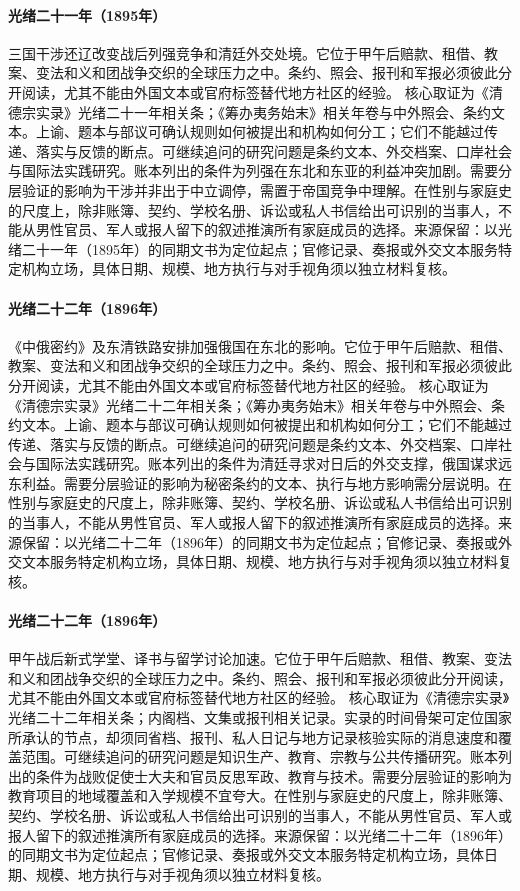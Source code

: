 \hypertarget{public:EQ-1895-TRIPLE-INTERVENTION}{}\paragraph{光绪二十一年（1895年）}三国干涉还辽改变战后列强竞争和清廷外交处境。它位于甲午后赔款、租借、教案、变法和义和团战争交织的全球压力之中。条约、照会、报刊和军报必须彼此分开阅读，尤其不能由外国文本或官府标签替代地方社区的经验。 核心取证为《清德宗实录》光绪二十一年相关条；《筹办夷务始末》相关年卷与中外照会、条约文本。上谕、题本与部议可确认规则如何被提出和机构如何分工；它们不能越过传递、落实与反馈的断点。可继续追问的研究问题是条约文本、外交档案、口岸社会与国际法实践研究。账本列出的条件为列强在东北和东亚的利益冲突加剧。需要分层验证的影响为干涉并非出于中立调停，需置于帝国竞争中理解。在性别与家庭史的尺度上，除非账簿、契约、学校名册、诉讼或私人书信给出可识别的当事人，不能从男性官员、军人或报人留下的叙述推演所有家庭成员的选择。来源保留：以光绪二十一年（1895年）的同期文书为定位起点；官修记录、奏报或外交文本服务特定机构立场，具体日期、规模、地方执行与对手视角须以独立材料复核。
\hypertarget{public:EQ-1896-LI-LOBANOV-TREATY}{}\paragraph{光绪二十二年（1896年）}《中俄密约》及东清铁路安排加强俄国在东北的影响。它位于甲午后赔款、租借、教案、变法和义和团战争交织的全球压力之中。条约、照会、报刊和军报必须彼此分开阅读，尤其不能由外国文本或官府标签替代地方社区的经验。 核心取证为《清德宗实录》光绪二十二年相关条；《筹办夷务始末》相关年卷与中外照会、条约文本。上谕、题本与部议可确认规则如何被提出和机构如何分工；它们不能越过传递、落实与反馈的断点。可继续追问的研究问题是条约文本、外交档案、口岸社会与国际法实践研究。账本列出的条件为清廷寻求对日后的外交支撑，俄国谋求远东利益。需要分层验证的影响为秘密条约的文本、执行与地方影响需分层说明。在性别与家庭史的尺度上，除非账簿、契约、学校名册、诉讼或私人书信给出可识别的当事人，不能从男性官员、军人或报人留下的叙述推演所有家庭成员的选择。来源保留：以光绪二十二年（1896年）的同期文书为定位起点；官修记录、奏报或外交文本服务特定机构立场，具体日期、规模、地方执行与对手视角须以独立材料复核。
\hypertarget{public:EQ-1896-MODERN-EDUCATION-EXPANSION}{}\paragraph{光绪二十二年（1896年）}甲午战后新式学堂、译书与留学讨论加速。它位于甲午后赔款、租借、教案、变法和义和团战争交织的全球压力之中。条约、照会、报刊和军报必须彼此分开阅读，尤其不能由外国文本或官府标签替代地方社区的经验。 核心取证为《清德宗实录》光绪二十二年相关条；内阁档、文集或报刊相关记录。实录的时间骨架可定位国家所承认的节点，却须同省档、报刊、私人日记与地方记录核验实际的消息速度和覆盖范围。可继续追问的研究问题是知识生产、教育、宗教与公共传播研究。账本列出的条件为战败促使士大夫和官员反思军政、教育与技术。需要分层验证的影响为教育项目的地域覆盖和入学规模不宜夸大。在性别与家庭史的尺度上，除非账簿、契约、学校名册、诉讼或私人书信给出可识别的当事人，不能从男性官员、军人或报人留下的叙述推演所有家庭成员的选择。来源保留：以光绪二十二年（1896年）的同期文书为定位起点；官修记录、奏报或外交文本服务特定机构立场，具体日期、规模、地方执行与对手视角须以独立材料复核。
